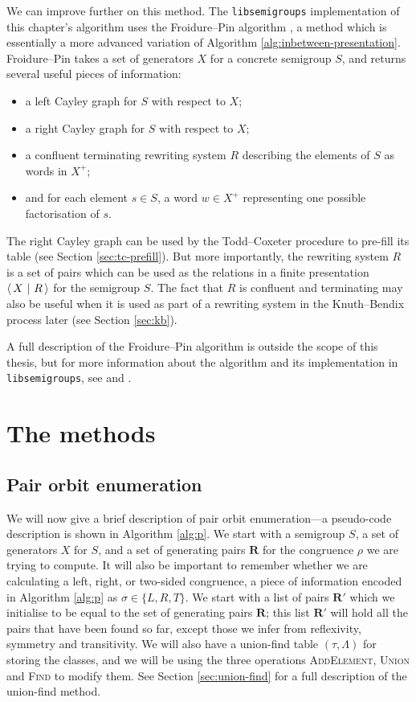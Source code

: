 We can improve further on this method.  The \texttt{libsemigroups}
implementation of this chapter's algorithm uses the Froidure--Pin algorithm
\cite{froidure_pin}, a method which is essentially a more advanced variation of
Algorithm \ref{alg:inbetween-presentation}.  Froidure--Pin takes a set of
generators $X$ for a concrete semigroup $S$, and returns several useful pieces
of information:
\begin{itemize}
\item a left Cayley graph for $S$ with respect to $X$;
\item a right Cayley graph for $S$ with respect to $X$;
\item a confluent terminating rewriting system $R$ describing the elements of
  $S$ as words in $X^+$;
\item and for each element $s \in S$, a word $w \in X^+$ representing one
  possible factorisation of $s$.
\end{itemize}
The right Cayley graph can be used by the Todd--Coxeter procedure to pre-fill its
table (see Section \ref{sec:tc-prefill}).  But more importantly, the rewriting
system $R$ is a set of pairs which can be used as the relations in a finite
presentation $\left\langle\,X ~\middle|~ R\,\right\rangle$ for the semigroup $S$.  The fact that $R$ is confluent
and terminating may also be useful when it is used as part of a rewriting system
in the Knuth--Bendix process later (see Section \ref{sec:kb}).

A full description of the Froidure--Pin algorithm is outside the scope of this
thesis, but for more information about the algorithm and its implementation in
\texttt{libsemigroups}, see \cite{froidure_pin_jonusas} and \cite{froidure_pin}.

\section{The methods}

\subsection{Pair orbit enumeration}
\label{sec:p}

We will now give a brief description of pair orbit enumeration---a pseudo-code
description is shown in Algorithm \ref{alg:p}.  We start with a semigroup $S$, a
set of generators $X$ for $S$, and a set of generating pairs $\mathbf{R}$ for
the congruence $\rho$ we are trying to compute.  It will also be important to
remember whether we are calculating a left, right, or two-sided congruence, a
piece of information encoded in Algorithm \ref{alg:p} as $\sigma \in \{L,R,T\}$.
We start with a list of pairs $\mathbf{R}'$ which we initialise to be equal to
the set of generating pairs $\mathbf{R}$; this list $\mathbf{R}'$ will hold all
the pairs that have been found so far, except those we infer from reflexivity,
symmetry and transitivity.  We will also have a union-find table
$(\tau,\Lambda)$ for storing the classes, and we will be using the three
operations \textsc{AddElement}, \textsc{Union} and \textsc{Find} to modify them.
See Section \ref{sec:union-find} for a full description of the union-find
method.

